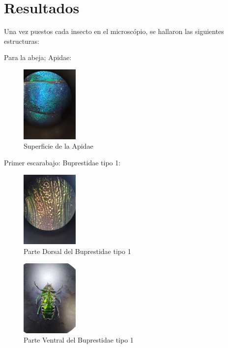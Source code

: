 \documentclass[a4paper, twocolumn, 10pt]{article}
\begin{document}
\section*{Resultados}

Una vez puestos cada insecto en el microscópio, se hallaron las siguientes estructuras:

\noindent Para la abeja; Apidae:

\begin{figure}[H]
    \centering
    \includegraphics[width = 0.25\textwidth]{puntos_abeja.jpg}
    \caption{Superficie de la Apidae}
    \label{tipos}
\end{figure}

\noindent Primer escarabajo: Buprestidae tipo 1:

\begin{figure}[H]
    \centering
    \includegraphics[width = 0.25\textwidth]{insecto1_arriba.jpg}
    \caption{Parte Dorsal del Buprestidae tipo 1}
    \label{fig:DorsalB1}
\end{figure}


\begin{figure}[H]
    \centering
    \includegraphics[width=0.25\textwidth]{insecto1_abajo_todo.jpg}
    \caption{Parte Ventral del Buprestidae tipo 1}
    \label{fig:VentralB1}
\end{figure}
\end{document}

